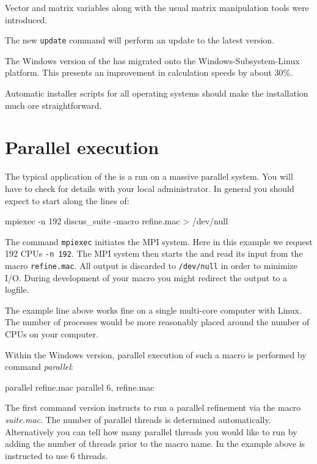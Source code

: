 Vector and matrix variables along with the usual matrix 
manipulation tools were introduced.  

The new {\tt update} command will perform an update to the latest 
version.

The Windows version of the \Suite has migrated onto the
Windows-Subsystem-Linux platform. This presents an improvement
in calculation speeds by about 30\%.

Automatic installer scripts for all operating systems should make
the installation much ore straightforward.

\section{Parallel execution \label{intro-par}}

The typical application of the \Suite is a run on a massive parallel 
system. You will have to check for details with your local administrator.
In general you should expect to start \Suite along the lines of:

\begin{MacVerbatim}
mpiexec -n 192 discus_suite -macro refine.mac > /dev/null
\end{MacVerbatim}

The command {\tt mpiexec} initiates the MPI system. Here in this example
we request 192 CPUs {\tt -n 192}. The MPI system then starts the \Suite
and read its input from the macro {\tt refine.mac}. All output is discarded
 to {\tt /dev/null} in order to minimize I/O. During development of your 
macro you might redirect the output to a logfile.

The example line above works fine on a single multi-core computer with 
Linux. The number of processes would be more reasonably placed around 
the number of CPUs on your computer.

Within the Windows version, parallel execution of such a macro is 
performed by \Suite command {\it parallel}:

\begin{MacVerbatim}
parallel refine.mac 
parallel 6, refine.mac 
\end{MacVerbatim}

The first command version instructs \Suite to run a parallel 
refinement via the macro {\it suite.mac}. The number of parallel 
threads is determined automatically. Alternatively you can tell 
\Suite how many parallel threads you would like to run by adding the
number of threads prior to the macro name. In the example above 
\Suite is instructed to use 6 threads.


